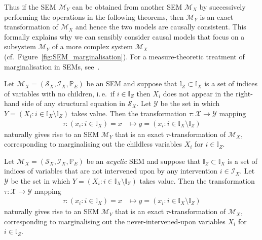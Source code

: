Thus if the SEM $\mathcal{M}_Y$ can be obtained from another SEM $\mathcal{M}_X$ by successively performing the operations in the following theorems, then $\mathcal{M}_Y$ is an exact transformation of $\mathcal{M}_X$ and hence the two models are causally consistent.
This formally explains why we can sensibly consider causal models that focus on a subsystem $\mathcal{M}_Y$ of a more complex system $\mathcal{M}_X$ (cf.\ Figure~\ref{fig:SEM_marginalisation}).
For a measure-theoretic treatment of marginalisation in SEMs, see~\cite{bongers2016structural}.

\begin{theorem}\label{theorem:childless}
Let $\mathcal{M}_X=(\mathcal{S}_X,\mathcal{I}_X,\mathbb{P}_E)$ be an SEM and suppose that ${\mathbb{I}_Z\subset\mathbb{I}_X}$ is a set of indices of variables with no children, i.\,e.\ if $i\in\mathbb{I}_Z$ then $X_i$ does not appear in the right-hand side of any structural equation in $\mathcal{S}_X$.
Let $\mathcal{Y}$ be the set in which $Y = \left( X_i: i\in\mathbb{I}_X\setminus \mathbb{I}_Z \right)$ takes value.
Then the transformation $\tau: \mathcal{X} \to \mathcal{Y}$ mapping
\begin{align*}
   \tau: \left( x_i: i\in\mathbb{I}_X \right) = x &\mapsto y = \left( x_i: i\in\mathbb{I}_X\setminus \mathbb{I}_Z \right)
\end{align*}
naturally gives rise to an SEM $\mathcal{M}_Y$ that is an exact $\tau$-transformation of $\mathcal{M}_X$, corresponding to marginalising out the childless variables $X_i$ for $i\in\mathbb{I}_Z$.
\end{theorem}




\begin{theorem}\label{theorem:never_intervened}
Let $\mathcal{M}_X=(\mathcal{S}_X,\mathcal{I}_X,\mathbb{P}_E)$ be an \emph{acyclic} SEM and suppose that ${\mathbb{I}_Z\subset\mathbb{I}_X}$ is a set of indices of variables that are not intervened upon by any intervention $i\in\mathcal{I}_X$.
Let $\mathcal{Y}$ be the set in which $Y = \left( X_i: i\in\mathbb{I}_X\setminus \mathbb{I}_Z \right)$ takes value.
Then the transformation $\tau: \mathcal{X} \to \mathcal{Y}$ mapping
\begin{align*}
   \tau: \left( x_i: i\in\mathbb{I}_X \right) = x &\mapsto y = \left( x_i: i\in\mathbb{I}_X\setminus \mathbb{I}_Z \right)
\end{align*}
naturally gives rise to an SEM $\mathcal{M}_Y$ that is an exact $\tau$-transformation of $\mathcal{M}_X$, corresponding to marginalising out the never-intervened-upon variables $X_i$ for $i\in\mathbb{I}_Z$.
\end{theorem}

